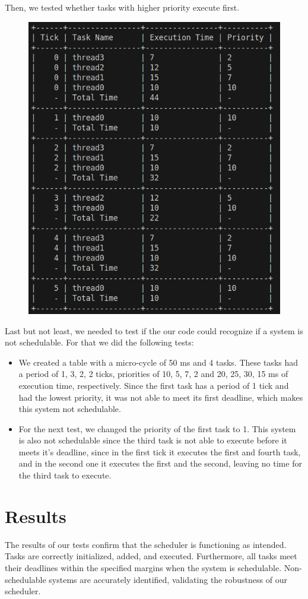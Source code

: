 \documentclass[a4paper,12pt]{article}
\begin{document}
Then, we tested whether tasks with higher priority execute first.
\begin{figure}[H]
    \centering
    \includegraphics[width=0.6\linewidth]{STBS_test_priority.png}
    \label{fig:STBS_test_priority}
\end{figure}

Last but not least, we needed to test if the our code could recognize if a system is not schedulable. For that we did the following tests:
\begin{itemize}
    \item We created a table with a micro-cycle of 50 ms and 4 tasks. These tasks had a period of 1, 3, 2, 2 ticks, priorities of 10, 5, 7, 2 and 20, 25, 30, 15 ms of execution time, respectively. Since the first task has a period of 1 tick and had the lowest priority, it was not able to meet its first deadline, which makes this system not schedulable.

    \item For the next test, we changed the priority of the first task to 1. This system is also not schedulable since the third task is not able to execute before it meets it's deadline, since in the first tick it executes the first and fourth task, and in the second one it executes the first and the second, leaving no time for the third task to execute.
\end{itemize}

\section{Results}
The results of our tests confirm that the scheduler is functioning as intended. Tasks are correctly initialized, added, and executed. Furthermore, all tasks meet their deadlines within the specified margins when the system is schedulable. Non-schedulable systems are accurately identified, validating the robustness of our scheduler.
\end{document}
